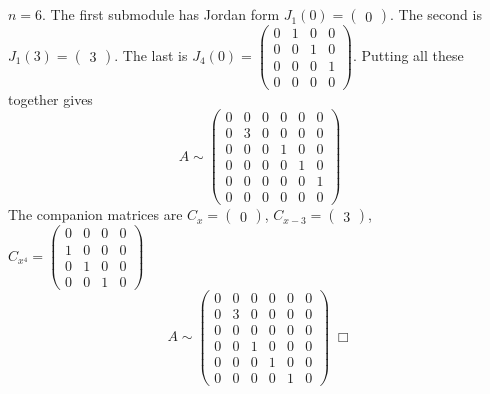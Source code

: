 \documentclass{article}
\begin{document}
\subsection{}
$n = 6$. The first submodule has Jordan form $J_1(0) = \begin{pmatrix}0\end{pmatrix}$. The second is $J_1(3) = \begin{pmatrix}3\end{pmatrix}$. The last is $J_4(0) = \begin{pmatrix}0 & 1 & 0 & 0\\ 0 & 0 & 1 & 0\\ 0 & 0 & 0 & 1\\ 0 & 0 & 0 & 0\end{pmatrix}$. Putting all these together gives
$$A \sim \begin{pmatrix}
0 & 0 & 0 & 0 & 0 & 0 \\ 0 & 3 & 0 & 0 & 0 & 0 \\ 0 & 0 & 0 & 1 & 0 & 0 \\ 0 & 0 & 0 & 0 & 1 & 0 \\ 0 & 0 & 0 & 0 & 0 & 1 \\ 0 & 0 & 0 & 0 & 0 & 0
\end{pmatrix}$$
The companion matrices are $C_x = \begin{pmatrix}0\end{pmatrix}$, $C_{x-3} = \begin{pmatrix}3\end{pmatrix}$, $C_{x^4} = \begin{pmatrix}0 & 0 & 0 & 0\\ 1 & 0 & 0 & 0\\ 0 & 1 & 0 & 0\\ 0 & 0 & 1 & 0\end{pmatrix}$
$$A \sim \begin{pmatrix}
0 & 0 & 0 & 0 & 0 & 0 \\ 0 & 3 & 0 & 0 & 0 & 0 \\ 0 & 0 & 0 & 0 & 0 & 0 \\ 0 & 0 & 1 & 0 & 0 & 0 \\ 0 & 0 & 0 & 1 & 0 & 0 \\ 0 & 0 & 0 & 0 & 1 & 0
\end{pmatrix} \;\Box$$
\end{document}
